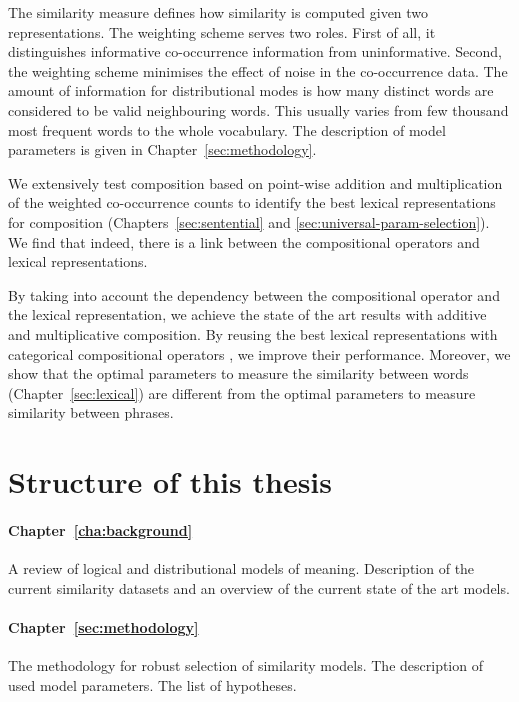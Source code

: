 The similarity measure defines how similarity is computed given two representations. The weighting scheme serves two roles. First of all, it distinguishes informative co-occurrence information from uninformative. Second, the weighting scheme minimises the effect of noise in the co-occurrence data. The amount of information for distributional modes is how many distinct words are considered to be valid neighbouring words. This usually varies from few thousand most frequent words to the whole vocabulary.  The description of model parameters is given in Chapter~\ref{sec:methodology}.

We extensively test composition based on point-wise addition and multiplication of the weighted co-occurrence counts to identify the best lexical representations for composition (Chapters~\ref{sec:sentential} and \ref{sec:universal-param-selection}). We find that indeed, there is a link between the compositional operators and lexical representations.

By taking into account the dependency between the compositional operator and the lexical representation,  we achieve the state of the art results with additive and multiplicative composition. By reusing the best lexical representations with categorical compositional operators \cite{DBLP:journals/corr/abs-1003-4394}, we improve their performance. Moreover, we show that the optimal parameters to measure the similarity between words (Chapter~\ref{sec:lexical}) are different from the optimal parameters to measure similarity between phrases.

\section{Structure of this thesis}
\label{sec:structure}

\paragraph{Chapter~\ref{cha:background}} A review of logical and distributional models of meaning. Description of the current similarity datasets and an overview of the current state of the art models.

\paragraph{Chapter~\ref{sec:methodology}} The methodology for robust selection of similarity models. The description of used model parameters. The list of hypotheses.

